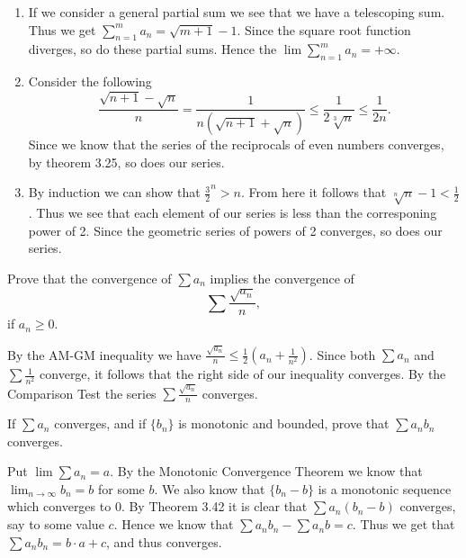 \begin{solution}
  \begin{enumerate}[label=(\alph*)]
    \item If we consider a general partial sum we see that we have a telescoping sum.
      Thus we get $\sum_{n = 1}^m a_n = \sqrt{m + 1} - 1$.
      Since the square root function diverges, so do these partial sums.
      Hence the $\lim \sum_{n = 1}^{m} a_n = + \infty$.
    \item Consider the following
      \[\frac{\sqrt{n + 1} - \sqrt{n}}{n} = \frac{1}{n (\sqrt{n + 1} + \sqrt{n})} \le \frac{1}{2 \sqrt[3]{n}} \le \frac{1}{2 n}.\]
      Since we know that the series of the reciprocals of even numbers converges, by theorem 3.25, so does our series.
    \item By induction we can show that $\frac{3}{2}^n > n$.
      From here it follows that $\sqrt[n]{n} - 1 < \frac{1}{2}$.
      Thus we see that each element of our series is less than the corresponing power of 2.
      Since the geometric series of powers of 2 converges, so does our series.
  \end{enumerate}
\end{solution}

\begin{problem}
  Prove that the convergence of $\sum a_n$ implies the convergence of
  \[\sum \frac{\sqrt{a_n}}{n},\]
  if $a_n \ge 0$.
\end{problem}

\begin{solution}
  By the AM-GM inequality we have $\frac{\sqrt{a_n}}{n} \le \frac{1}{2} (a_n + \frac{1}{n^2})$.
  Since both $\sum a_n$ and $\sum \frac{1}{n^2}$ converge, it follows that the right side of our inequality converges.
  By the Comparison Test the series $\sum \frac{\sqrt{a_n}}{n}$ converges.
\end{solution}

\begin{problem}
  If $\sum a_n$ converges, and if $\{b_n\}$ is monotonic and bounded, prove that $\sum a_n b_n$ converges.
\end{problem}

\begin{solution}
  Put $\lim \sum a_n = a$.
  By the Monotonic Convergence Theorem we know that $\lim_{n \to \infty} b_n = b$ for some $b$.
  We also know that $\{b_n - b\}$ is a monotonic sequence which converges to $0$.
  By Theorem 3.42 it is clear that $\sum a_n (b_n - b)$ converges, say to some value $c$.
  Hence we know that $\sum a_n b_n - \sum a_n b = c$.
  Thus we get that $\sum a_n b_n = b \cdot a + c$, and thus converges.

\end{solution}

